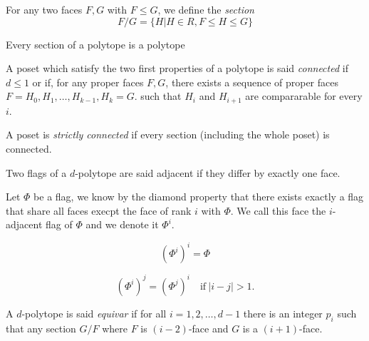 \begin{definition}
  For any two faces $F, G$ with $F \le G$, we define the \textit{section} \[
    F/G = \{H | H \in R, F \le H \le G\}
  \]
\end{definition}

\begin{property}
  Every section of a polytope is a polytope
\end{property}

\begin{definition}
  A poset which satisfy the two first properties of a polytope is said \textit{connected} if $d \le 1$ or if, for any proper faces $F, G$, there exists a sequence of proper faces $F = H_0, H_1, \dots, H_{k-1}, H_k = G$. such that $H_i$ and $H_{i+1}$ are compararable for every $i$.
\end{definition}

\begin{definition}
  A poset is \textit{strictly connected} if every section (including the whole poset) is connected.
\end{definition}

\begin{definition}
  Two flags of a $d$-polytope are said adjacent if they differ by exactly one face.
\end{definition}

\begin{definition}
  Let $\Phi$ be a flag, we know by the diamond property that there exists exactly a flag that share all faces execpt the face of rank $i$ with $\Phi$. We call this face the $i$-adjacent flag of $\Phi$ and we denote it $\Phi^i$.
\end{definition}

\begin{property}
  \[
    \left(\Phi^i\right)^i = \Phi
  \]
\end{property}

\begin{property}
  \[
    \left(\Phi^i\right)^j = \left(\Phi^j\right)^i \quad \text{if} \ |i-j| > 1.
  \]
\end{property}

\begin{definition}
  A $d$-polytope is said \textit{equivar} if for all $i = 1, 2, \dots, d-1$ there is an integer $p_i$ such that any section $G/F$ where $F$ is $(i-2)$-face and $G$ is a $(i+1)$-face.
\end{definition}

